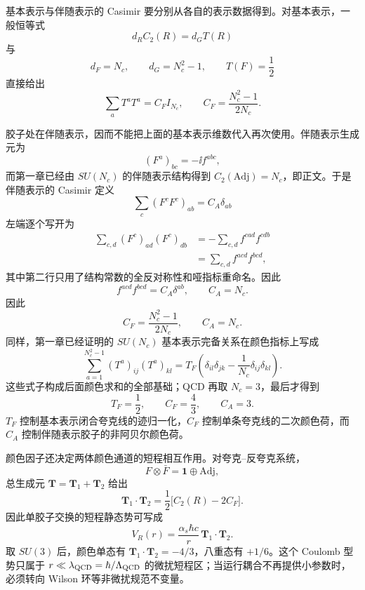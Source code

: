 基本表示与伴随表示的 Casimir 要分别从各自的表示数据得到。对基本表示，一般恒等式
\[
 d_R C_2(R)=d_G T(R)
\]
与
\[
 d_F=N_c,\qquad d_G=N_c^2-1,\qquad T(F)=\frac12
\]
直接给出
\begin{equation}
 \sum_aT^aT^a=C_FI_{N_c},
 \qquad
 C_F=\frac{N_c^2-1}{2N_c}.
 \label{eq:CF-definition-dp10}
\end{equation}

胶子处在伴随表示，因而不能把上面的基本表示维数代入再次使用。伴随表示生成元为
\[
 (F^a)_{bc}=-\ii f^{abc},
\]
而第一章已经由 $SU(N_c)$ 的伴随表示结构得到
$C_2(\mathrm{Adj})=N_c$，即正文。于是伴随表示的 Casimir 定义
\[
 \sum_c(F^cF^c)_{ab}=C_A\delta_{ab}
\]
左端逐个写开为
\begin{align*}
 \sum_{c,d}(F^c)_{ad}(F^c)_{db}
 &=-\sum_{c,d}f^{cad}f^{cdb}\\
 &=\sum_{c,d}f^{acd}f^{bcd},
\end{align*}
其中第二行只用了结构常数的全反对称性和哑指标重命名。因此
\begin{equation}
 f^{acd}f^{bcd}=C_A\delta^{ab},
 \qquad C_A=N_c.
 \label{eq:CA-definition-dp10}
\end{equation}
因此
\begin{equation}
 \boxed{
 C_F=\frac{N_c^2-1}{2N_c},
 \qquad C_A=N_c.}
 \label{eq:SUN-CF-CA-dp32}
\end{equation}
同样，第一章已经证明的 $SU(N_c)$ 基本表示完备关系在颜色指标上写成
\begin{equation}
 \boxed{
 \sum_{a=1}^{N_c^2-1}(T^a)_{ij}(T^a)_{kl}
 =T_F\left(\delta_{il}\delta_{jk}-\frac1{N_c}\delta_{ij}\delta_{kl}\right).}
 \label{eq:SUN-fierz-dp10}
\end{equation}
这些式子构成后面颜色求和的全部基础；QCD 再取 $N_c=3$，最后才得到
\[
T_F=\frac12,\qquad C_F=\frac43,\qquad C_A=3.
\]
$T_F$ 控制基本表示闭合夸克线的迹归一化，$C_F$ 控制单条夸克线的二次颜色荷，而 $C_A$ 控制伴随表示胶子的非阿贝尔颜色荷。

颜色因子还决定两体颜色通道的短程相互作用。对夸克--反夸克系统，
\begin{equation*}
 F\otimes\bar F=\mathbf1\oplus\mathrm{Adj},
\end{equation*}
总生成元 $\mathbf T=\mathbf T_1+\mathbf T_2$ 给出
\begin{equation}
 \mathbf T_1\!\cdot\!\mathbf T_2
 =\frac12\bigl[C_2(R)-2C_F\bigr].
 \label{eq:qcd-two-body-color-casimir-dp73}
\end{equation}
因此单胶子交换的短程静态势可写成
\begin{equation*}
 V_R(r)=\frac{\alpha_s\hbar c}{r}\,
 \mathbf T_1\!\cdot\!\mathbf T_2.
\end{equation*}
取 $SU(3)$ 后，颜色单态有 $\mathbf T_1\!\cdot\!\mathbf T_2=-4/3$，八重态有 $+1/6$。这个 Coulomb 型势只属于 $r\ll\lambda_{\rm QCD}=\hbar/\Lambda_{\rm QCD}$ 的微扰短程区；当运行耦合不再提供小参数时，必须转向 Wilson 环等非微扰规范不变量。

